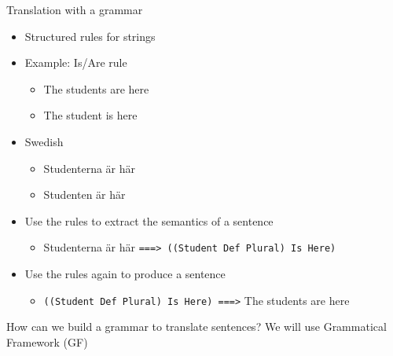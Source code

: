 \begin{frame}{Translation with a grammar} 
         \begin{itemize}
		   \item Structured rules for strings \pause
           \item Example: Is/Are rule \pause
           \begin{itemize}
             \item The students \textcolor{String}{are} here
             \item The student \textcolor{String}{is} here \pause
           \end{itemize}             
           \item Swedish
           \begin{itemize}
             \item Studenterna \textcolor{String}{{\"a}r} h{\"a}r
             \item Studenten \textcolor{String}{{\"a}r} h{\"a}r \pause
           \end{itemize}\pause
           \item Use the rules to extract the semantics of a sentence\pause
           \begin{itemize}
             \item Studenterna {\"a}r h{\"a}r
             \newline         \texttt{===> ((Student Def Plural) Is Here)}\pause
           \end{itemize}
           \item Use the rules again to produce a sentence \pause
           \begin{itemize}
             \item \texttt{((Student Def Plural) Is Here) \newline===>} The students are here \pause
           \end{itemize}
         \end{itemize}
           \begin{block}{How can we build a grammar to translate sentences?}
              We will use Grammatical Framework (GF)
         \end{block}
\end{frame}
